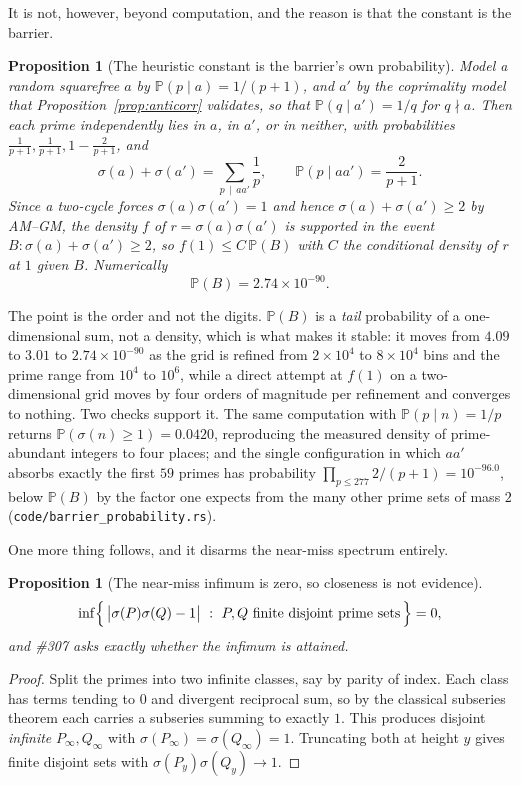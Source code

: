 \documentclass[11pt]{article}
\newtheorem{proposition}[theorem]{Proposition}
\theoremstyle{definition}
\begin{document}
It is not, however, beyond computation, and the reason is that the constant is the barrier.

\begin{proposition}[The heuristic constant is the barrier's own probability]\label{prop:f1}
Model a random squarefree $a$ by $\mathbb{P}(p\mid a)=1/(p+1)$, and $a'$ by the coprimality model
that Proposition~\textup{\ref{prop:anticorr}} validates, so that $\mathbb{P}(q\mid a')=1/q$ for
$q\nmid a$. Then each prime independently lies in $a$, in $a'$, or in neither, with probabilities
$\tfrac1{p+1},\tfrac1{p+1},1-\tfrac2{p+1}$, and
\[ \sigma(a)+\sigma(a')=\sum_{p\,\mid\,aa'}\frac1p,\qquad \mathbb{P}(p\mid aa')=\frac2{p+1}. \]
Since a two-cycle forces $\sigma(a)\sigma(a')=1$ and hence $\sigma(a)+\sigma(a')\ge2$ by
\textup{AM--GM}, the density $f$ of $r=\sigma(a)\sigma(a')$ is supported in the event
$B:\sigma(a)+\sigma(a')\ge2$, so $f(1)\le C\,\mathbb{P}(B)$ with $C$ the conditional density of $r$
at $1$ given $B$. Numerically
\[ \mathbb{P}(B)=2.74\times10^{-90}. \]
\end{proposition}

The point is the order and not the digits. $\mathbb{P}(B)$ is a \emph{tail} probability of a
one-dimensional sum, not a density, which is what makes it stable: it moves from $4.09$ to $3.01$ to
$2.74\times10^{-90}$ as the grid is refined from $2\times10^4$ to $8\times10^4$ bins and the prime
range from $10^4$ to $10^6$, while a direct attempt at $f(1)$ on a two-dimensional grid moves by four
orders of magnitude per refinement and converges to nothing. Two checks support it. The same
computation with $\mathbb{P}(p\mid n)=1/p$ returns $\mathbb{P}(\sigma(n)\ge1)=0.0420$, reproducing
the measured density of prime-abundant integers to four places; and the single configuration in which
$aa'$ absorbs exactly the first $59$ primes has probability $\prod_{p\le277}2/(p+1)=10^{-96.0}$,
below $\mathbb{P}(B)$ by the factor one expects from the many other prime sets of mass $2$
\textup{(\texttt{code/barrier\_probability.rs})}.

One more thing follows, and it disarms the near-miss spectrum entirely.

\begin{proposition}[The near-miss infimum is zero, so closeness is not evidence]\label{prop:infzero}
\[ \inf\Bigl\{\,\bigl|\sigma(P)\sigma(Q)-1\bigr|\ :\ P,Q\ \text{finite disjoint prime sets}\,\Bigr\}=0, \]
and \#307 asks exactly whether the infimum is attained.
\end{proposition}
\begin{proof}
Split the primes into two infinite classes, say by parity of index. Each class has terms tending to
$0$ and divergent reciprocal sum, so by the classical subseries theorem each carries a subseries
summing to exactly $1$. This produces disjoint \emph{infinite} $P_\infty,Q_\infty$ with
$\sigma(P_\infty)=\sigma(Q_\infty)=1$. Truncating both at height $y$ gives finite disjoint sets with
$\sigma(P_y)\sigma(Q_y)\to1$.
\end{proof}
\end{document}
